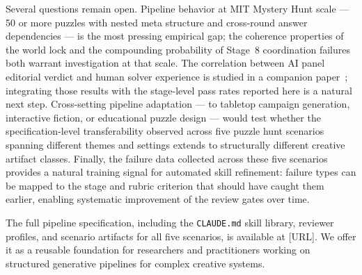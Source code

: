 Several questions remain open. Pipeline behavior at MIT Mystery Hunt scale — 50 or more puzzles with nested meta structure and cross-round answer dependencies — is the most pressing empirical gap; the coherence properties of the world lock and the compounding probability of Stage~8 coordination failures both warrant investigation at that scale. The correlation between AI panel editorial verdict and human solver experience is studied in a companion paper~\cite{dellaLibera2025calibration}; integrating those results with the stage-level pass rates reported here is a natural next step. Cross-setting pipeline adaptation — to tabletop campaign generation, interactive fiction, or educational puzzle design — would test whether the specification-level transferability observed across five puzzle hunt scenarios spanning different themes and settings extends to structurally different creative artifact classes. Finally, the failure data collected across these five scenarios provides a natural training signal for automated skill refinement: failure types can be mapped to the stage and rubric criterion that should have caught them earlier, enabling systematic improvement of the review gates over time.

The full pipeline specification, including the \texttt{CLAUDE.md} skill library, reviewer profiles, and scenario artifacts for all five scenarios, is available at [URL]. We offer it as a reusable foundation for researchers and practitioners working on structured generative pipelines for complex creative systems.
